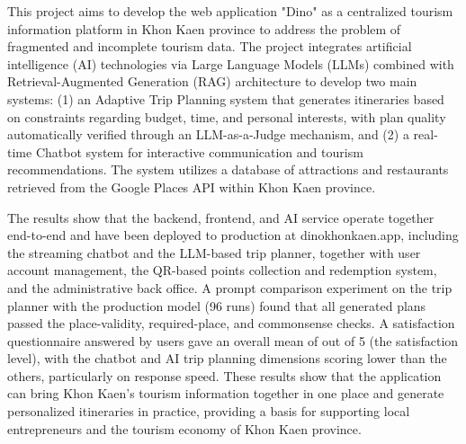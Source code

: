 
This project aims to develop the web application "Dino" as a centralized tourism information platform in Khon Kaen province to address the problem of fragmented and incomplete tourism data. The project integrates artificial intelligence (AI) technologies via Large Language Models (LLMs) combined with Retrieval-Augmented Generation (RAG) architecture to develop two main systems: (1) an Adaptive Trip Planning system that generates itineraries based on constraints regarding budget, time, and personal interests, with plan quality automatically verified through an LLM-as-a-Judge mechanism, and (2) a real-time Chatbot system for interactive communication and tourism recommendations. The system utilizes a database of attractions and restaurants retrieved from the Google Places API within Khon Kaen province.

The results show that the backend, frontend, and AI service operate together end-to-end and have been deployed to production at dinokhonkaen.app, including the streaming chatbot and the LLM-based trip planner, together with user account management, the QR-based points collection and redemption system, and the administrative back office. A prompt comparison experiment on the trip planner with the production model (96 runs) found that all generated plans passed the place-validity, required-place, and commonsense checks. A satisfaction questionnaire answered by \surveyN{} users gave an overall mean of \surveyOverallMean{} out of 5 (the \surveyOverallLevelEN{} satisfaction level), with the chatbot and AI trip planning dimensions scoring lower than the others, particularly on response speed. These results show that the application can bring Khon Kaen's tourism information together in one place and generate personalized itineraries in practice, providing a basis for supporting local entrepreneurs and the tourism economy of Khon Kaen province.
